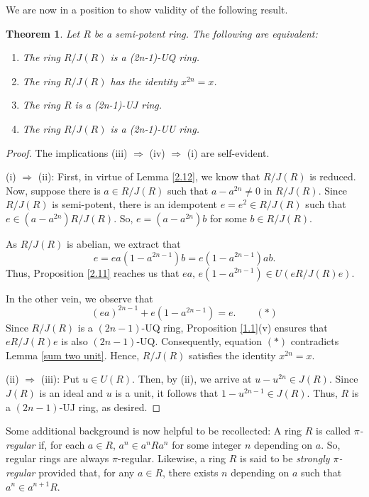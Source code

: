 \documentclass[12pt]{amsart}
\newtheorem{theorem}{Theorem}[section]
\theoremstyle{definition}
\begin{document}
\medskip

We are now in a position to show validity of the following result.

\begin{theorem}\label{semipotent}
Let $R$ be a semi-potent ring. The following are equivalent:
\begin{enumerate}
\item	
The ring $R/J(R)$ is a (2n-1)-UQ ring.
\item	
The ring $R/J(R)$ has the identity $x^{2n} = x$.
\item	
The ring $R$ is a (2n-1)-UJ ring.
\item	
The ring $R/J(R)$ is a (2n-1)-UU ring.
\end{enumerate}
\end{theorem}

\begin{proof}
The implications (iii) $\Rightarrow$ (iv) $\Rightarrow$ (i) are self-evident.

(i) $\Rightarrow$ (ii): First, in virtue of Lemma \ref{2.12}, we know that \( R/J(R) \) is reduced. Now, suppose there is \( a \in R/J(R) \) such that \( a - a^{2n} \neq 0 \) in \( R/J(R) \). Since \( R/J(R) \) is semi-potent, there is an idempotent \( e = e^2 \in R/J(R) \) such that \( e \in (a - a^{2n})R/J(R) \). So, \( e = (a - a^{2n})b \) for some \( b \in R/J(R) \).

As \( R/J(R) \) is abelian, we extract that
\[
e = ea(1 - a^{2n-1})b = e(1 - a^{2n-1})ab.
\]
Thus, Proposition \ref{2.11} reaches us that \( ea,\, e(1 - a^{2n-1}) \in U(eR/J(R)e) \).

In the other vein, we observe that
\[
(ea)^{2n-1} + e(1 - a^{2n-1}) = e. \qquad (*)
\]
Since \( R/J(R) \) is a \( (2n - 1) \)-UQ ring, Proposition \ref{1.1}(v) ensures that \( eR/J(R)e \) is also \( (2n - 1) \)-UQ. Consequently, equation \( (*) \) contradicts Lemma \ref{sum two unit}. Hence, \( R/J(R) \) satisfies the identity \( x^{2n} = x \).

(ii) $\Rightarrow$ (iii): Put \( u \in U(R) \). Then, by (ii), we arrive at \( u - u^{2n} \in J(R) \). Since \( J(R) \) is an ideal and \( u \) is a unit, it follows that \( 1 - u^{2n-1} \in J(R) \). Thus, \( R \) is a \( (2n - 1) \)-UJ ring, as desired.
\end{proof}

Some additional background is now helpful to be recollected: A ring $R$ is called {\it $\pi$-regular} if, for each $a\in R$, $a^n\in a^nRa^n$ for some integer $n$ depending on $a$. So, regular rings are always $\pi$-regular. Likewise, a ring $R$ is said to be {\it strongly $\pi$-regular} provided that, for any $a\in R$, there exists $n$ depending on $a$ such that $a^n\in a^{n+1}R$.
\end{document}
